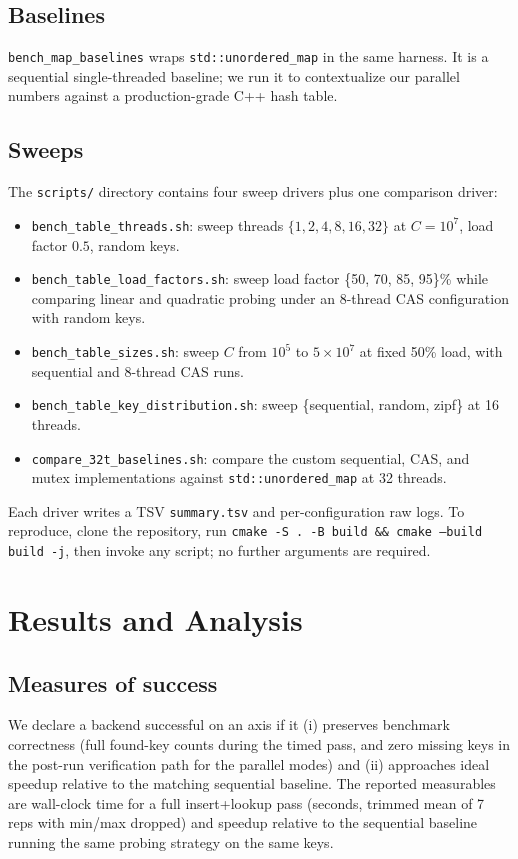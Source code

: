 \documentclass[10pt,twocolumn]{article}
\begin{document}
\subsection{Baselines}
\texttt{bench\_map\_baselines} wraps \texttt{std::unordered\_map}
in the same harness. It is a sequential single-threaded baseline;
we run it to contextualize our parallel numbers against a
production-grade C++ hash table.

\subsection{Sweeps}
The \texttt{scripts/} directory contains four sweep drivers plus one
comparison driver:
\begin{itemize}
\item \texttt{bench\_table\_threads.sh}: sweep threads $\{1,2,4,8,16,32\}$
at $C=10^7$, load factor $0.5$, random keys.
\item \texttt{bench\_table\_load\_factors.sh}: sweep load factor
\{50, 70, 85, 95\}\% while comparing linear and quadratic probing
under an 8-thread CAS configuration with random keys.
\item \texttt{bench\_table\_sizes.sh}: sweep $C$ from $10^5$ to
$5 \times 10^7$ at fixed 50\% load, with sequential and 8-thread CAS
runs.
\item \texttt{bench\_table\_key\_distribution.sh}: sweep
\{sequential, random, zipf\} at 16 threads.
\item \texttt{compare\_32t\_baselines.sh}: compare the custom
sequential, CAS, and mutex implementations against
\texttt{std::unordered\_map} at 32 threads.
\end{itemize}
Each driver writes a TSV \texttt{summary.tsv} and per-configuration
raw logs. To reproduce, clone the repository, run
\texttt{cmake -S . -B build \&\& cmake --build build -j}, then invoke any
script; no further arguments are required.

\section{Results and Analysis}

\subsection{Measures of success}
We declare a backend successful on an axis if it (i) preserves
benchmark correctness (full found-key counts during the timed pass,
and zero missing keys in the post-run verification path for the
parallel modes) and (ii)
approaches ideal speedup relative to the matching sequential
baseline. The reported measurables are wall-clock time for a full
insert+lookup pass (seconds, trimmed mean of 7 reps with min/max
dropped) and speedup relative to the sequential baseline running the
same probing strategy on the same keys.
\end{document}
